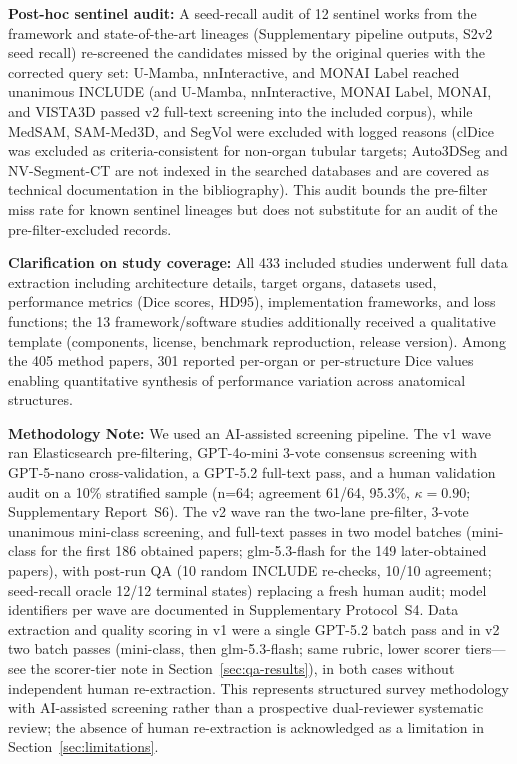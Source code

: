 \textbf{Post-hoc sentinel audit:} A seed-recall audit of 12 sentinel works from the framework and state-of-the-art lineages (Supplementary pipeline outputs, S2v2 seed recall) re-screened the candidates missed by the original queries with the corrected query set: U-Mamba, nnInteractive, and MONAI Label reached unanimous INCLUDE (and U-Mamba, nnInteractive, MONAI Label, MONAI, and VISTA3D passed v2 full-text screening into the included corpus), while MedSAM, SAM-Med3D, and SegVol were excluded with logged reasons (clDice was excluded as criteria-consistent for non-organ tubular targets; Auto3DSeg and NV-Segment-CT are not indexed in the searched databases and are covered as technical documentation in the bibliography). This audit bounds the pre-filter miss rate for known sentinel lineages but does not substitute for an audit of the pre-filter-excluded records.

\textbf{Clarification on study coverage:} All 433 included studies underwent full data extraction including architecture details, target organs, datasets used, performance metrics (Dice scores, HD95), implementation frameworks, and loss functions; the 13 framework/software studies additionally received a qualitative template (components, license, benchmark reproduction, release version). Among the 405 method papers, 301 reported per-organ or per-structure Dice values enabling quantitative synthesis of performance variation across anatomical structures.

\textbf{Methodology Note:} We used an AI-assisted screening pipeline. The v1 wave ran Elasticsearch pre-filtering, GPT-4o-mini 3-vote consensus screening with GPT-5-nano cross-validation, a GPT-5.2 full-text pass, and a human validation audit on a 10\% stratified sample (n=64; agreement 61/64, 95.3\%, $\kappa=0.90$; Supplementary Report~S6). The v2 wave ran the two-lane pre-filter, 3-vote unanimous mini-class screening, and full-text passes in two model batches (mini-class for the first 186 obtained papers; glm-5.3-flash for the 149 later-obtained papers), with post-run QA (10 random INCLUDE re-checks, 10/10 agreement; seed-recall oracle 12/12 terminal states) replacing a fresh human audit; model identifiers per wave are documented in Supplementary Protocol~S4. Data extraction and quality scoring in v1 were a single GPT-5.2 batch pass and in v2 two batch passes (mini-class, then glm-5.3-flash; same rubric, lower scorer tiers---see the scorer-tier note in Section~\ref{sec:qa-results}), in both cases without independent human re-extraction. This represents structured survey methodology with AI-assisted screening rather than a prospective dual-reviewer systematic review; the absence of human re-extraction is acknowledged as a limitation in Section~\ref{sec:limitations}.

